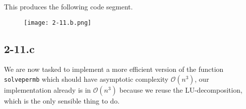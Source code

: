 \documentclass{article}
\begin{document}
\pagebreak

This produces the following code segment.
\begin{figure}[!hbt]
    \centering
\texttt{[image: 2-11.b.png]}
\end{figure}

\subsection*{2-11.c}
We are now tasked to implement a more efficient version of the function \verb|solvepermb| which should have asymptotic complexity $\mathcal{O}\left(n^{3}\right)$, our implementation already is in $\mathcal{O}\left(n^{3}\right)$ because we reuse the LU-decomposition, which is the only sensible thing to do. 
\end{document}
